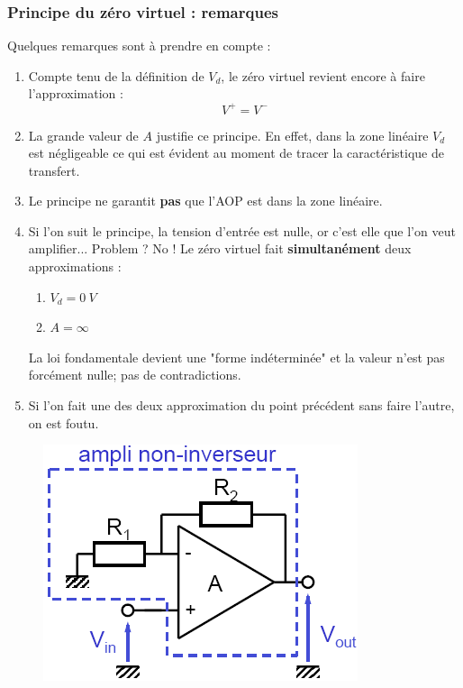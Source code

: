 \documentclass	[11pt, a4paper, openany]{book}
\begin{document}
\subsubsection{Principe du zéro virtuel : remarques}
Quelques remarques sont à prendre en compte :
\begin{enumerate}
\item Compte tenu de la définition de $V_d$, le zéro virtuel revient encore à faire l'approximation :
\begin{equation}
V^+ = V^-
\end{equation}
\item La grande valeur de $A$ justifie ce principe. En effet, dans la zone linéaire $V_d$ est négligeable ce qui est évident au moment de tracer la caractéristique de transfert.
\item Le principe ne garantit \textbf{pas} que l'AOP est dans la zone linéaire.
\item Si l'on suit le principe, la tension d'entrée est nulle, or c'est elle que l'on veut amplifier... Problem ? No ! Le zéro virtuel fait \textbf{simultanément} deux approximations :
\begin{enumerate}
\item $V_d = 0\ V$
\item $A = \infty$
\end{enumerate}
La loi fondamentale devient une "forme indéterminée" et la valeur n'est pas forcément nulle; pas de contradictions.
\item Si l'on fait une des deux approximation du point précédent sans faire l'autre, on est foutu.
\end{enumerate}

\begin{figure}
\includegraphics[scale=0.45]{img/image45}
\end{figure}
\end{document}
